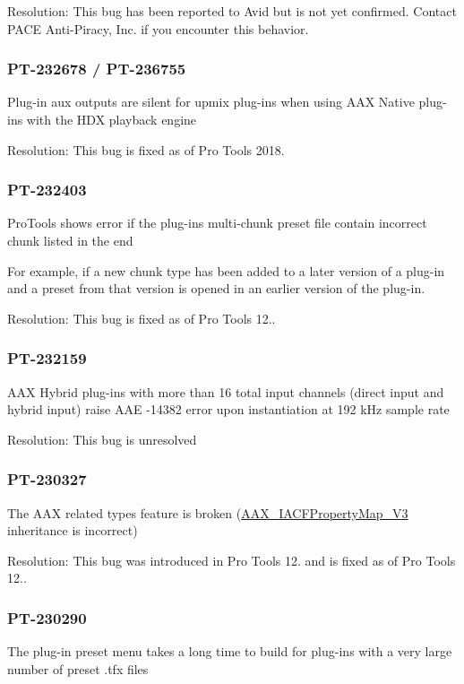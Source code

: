 Resolution\+: This bug has been reported to Avid but is not yet confirmed. Contact P\+A\+C\+E Anti-\/\+Piracy, Inc. if you encounter this behavior.\hypertarget{a00374_PT-232678}{}\subsubsection{P\+T-\/232678 / P\+T-\/236755}\label{a00374_PT-232678}
Plug-\/in aux outputs are silent for upmix plug-\/ins when using A\+A\+X Native plug-\/ins with the H\+D\+X playback engine

Resolution\+: This bug is fixed as of Pro Tools 2018.\hypertarget{a00374_PT-232403}{}\subsubsection{P\+T-\/232403}\label{a00374_PT-232403}
Pro\+Tools shows error if the plug-\/in\textquotesingle{}s multi-\/chunk preset file contain incorrect chunk listed in the end

For example, if a new chunk type has been added to a later version of a plug-\/in and a preset from that version is opened in an earlier version of the plug-\/in.

Resolution\+: This bug is fixed as of Pro Tools 12..\hypertarget{a00374_PT-232159}{}\subsubsection{P\+T-\/232159}\label{a00374_PT-232159}
A\+A\+X Hybrid plug-\/ins with more than 16 total input channels (direct input and hybrid input) raise A\+A\+E -\/14382 error upon instantiation at 192 k\+Hz sample rate

Resolution\+: This bug is unresolved\hypertarget{a00374_PT-230327}{}\subsubsection{P\+T-\/230327}\label{a00374_PT-230327}
The A\+A\+X related types feature is broken (\hyperlink{a00081}{A\+A\+X\+\_\+\+I\+A\+C\+F\+Property\+Map\+\_\+\+V3} inheritance is incorrect)

Resolution\+: This bug was introduced in Pro Tools 12. and is fixed as of Pro Tools 12..\hypertarget{a00374_PT-230290}{}\subsubsection{P\+T-\/230290}\label{a00374_PT-230290}
The plug-\/in preset menu takes a long time to build for plug-\/ins with a very large number of preset .tfx files

